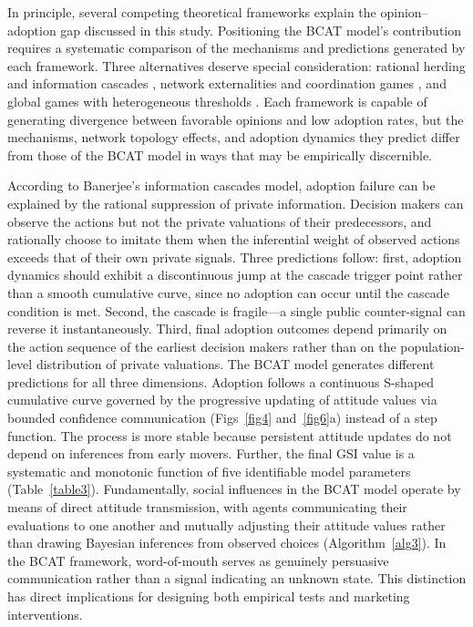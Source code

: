 \documentclass[10pt,letterpaper]{article}
\begin{document}
In principle, several competing theoretical frameworks explain the opinion--adoption gap discussed in this study. Positioning the BCAT model's contribution requires a systematic comparison of the mechanisms and predictions generated by each framework. Three alternatives deserve special consideration: rational herding and information cascades \cite{Banerjee1992}, network externalities and coordination games \cite{Katz1985}, and global games with heterogeneous thresholds \cite{Morris2003}. Each framework is capable of generating divergence between favorable opinions and low adoption rates, but the mechanisms, network topology effects, and adoption dynamics they predict differ from those of the BCAT model in ways that may be empirically discernible.

According to Banerjee's \cite{Banerjee1992} information cascades model, adoption failure can be explained by the rational suppression of private information. Decision makers can observe the actions but not the private valuations of their predecessors, and rationally choose to imitate them when the inferential weight of observed actions exceeds that of their own private signals. Three predictions follow: first, adoption dynamics should exhibit a discontinuous jump at the cascade trigger point rather than a smooth cumulative curve, since no adoption can occur until the cascade condition is met. Second, the cascade is fragile---a single public counter-signal can reverse it instantaneously. Third, final adoption outcomes depend primarily on the action sequence of the earliest decision makers rather than on the population-level distribution of private valuations. The BCAT model generates different predictions for all three dimensions. Adoption follows a continuous S-shaped cumulative curve governed by the progressive updating of attitude values via bounded confidence communication (Figs~\ref{fig4} and~\ref{fig6}a) instead of a step function. The process is more stable because persistent attitude updates do not depend on inferences from early movers. Further, the final GSI value is a systematic and monotonic function of five identifiable model parameters (Table~\ref{table3}). Fundamentally, social influences in the BCAT model operate by means of direct attitude transmission, with agents communicating their evaluations to one another and mutually adjusting their attitude values rather than drawing Bayesian inferences from observed choices (Algorithm~\ref{alg3}). In the BCAT framework, word-of-mouth serves as genuinely persuasive communication rather than a signal indicating an unknown state. This distinction has direct implications for designing both empirical tests and marketing interventions.
\end{document}
